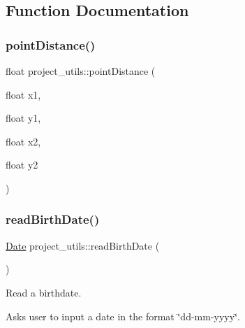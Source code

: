 \subsection{Function Documentation}
\mbox{\label{namespaceproject__utils_ac8764d0b6de158f9eba38a6b517d8cd8}} 
\subsubsection{\texorpdfstring{point\+Distance()}{pointDistance()}}
{\footnotesize\ttfamily float project\+\_\+utils\+::point\+Distance (\begin{DoxyParamCaption}\item[{float}]{x1,  }\item[{float}]{y1,  }\item[{float}]{x2,  }\item[{float}]{y2 }\end{DoxyParamCaption})}

\mbox{\label{namespaceproject__utils_adab6593a2685f866191793214c7c60ce}} 
\subsubsection{\texorpdfstring{read\+Birth\+Date()}{readBirthDate()}}
{\footnotesize\ttfamily \mbox{\hyperlink{classDate}{Date}} project\+\_\+utils\+::read\+Birth\+Date (\begin{DoxyParamCaption}{ }\end{DoxyParamCaption})}



Read a birthdate. 

Asks user to input a date in the format \char`\"{}dd-\/mm-\/yyyy\char`\"{}.

